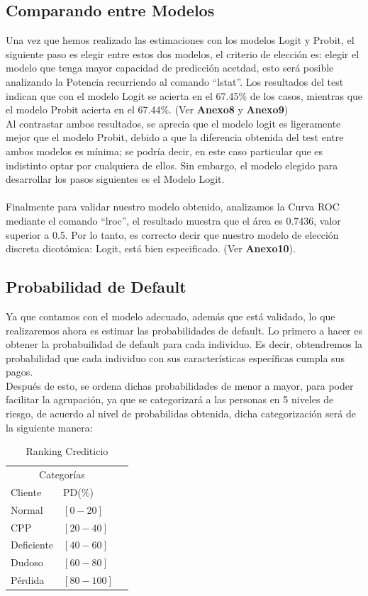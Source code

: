 \documentclass[11pt,fleqn]{book} %
\numberwithin{equation}{section} %
\numberwithin{figure}{section} %
\numberwithin{table}{section} %
\begin{document}
\subsection{Comparando entre Modelos}
Una vez que hemos realizado las estimaciones con los modelos Logit y Probit, el siguiente paso es elegir entre estos dos modelos, el criterio de elección es: elegir el modelo que tenga mayor capacidad de predicción acetdad, esto será posible analizando la Potencia recurriendo al comando ``lstat''. Los resultados del test indican que con el modelo Logit se acierta en el 67.45\% de los casos, mientras que el modelo Probit acierta en el 67.44\%. (Ver \textbf{Anexo8} y \textbf{Anexo9})  
\\
Al contrastar ambos resultados, se aprecia que el modelo logit es ligeramente mejor que el modelo Probit, debido a que la diferencia obtenida del test entre ambos modelos es mínima; se podría decir, en este caso particular que es indistinto optar por cualquiera de ellos. Sin embargo, el modelo elegido para desarrollar los pasos siguientes es el Modelo Logit.
\\\\
Finalmente para validar nuestro modelo obtenido, analizamos la Curva ROC mediante el comando ``lroc'', el resultado muestra que el área es 0.7436, valor superior a 0.5. Por lo tanto, es correcto decir que nuestro modelo de elección discreta dicotómica: Logit, está bien especificado. (Ver \textbf{Anexo10}).

\subsection{Probabilidad de Default}

Ya que contamos con el modelo adecuado, además que está validado, lo que realizaremos ahora es estimar las probabilidades de default. Lo primero a hacer es obtener la probabuilidad de default para cada individuo. Es decir, obtendremos la probabilidad que cada individuo con sus características específicas cumpla sus pagos.
\\
Después de esto, se ordena dichas probabilidades de menor a mayor, para poder facilitar la agrupación, ya que se categorizará a las personas en 5 niveles de riesgo, de acuerdo al nivel de probabilidas obtenida, dicha categorización será de la siguiente manera:

\begin{table}[H]
\caption{Ranking Crediticio}
\centering
\begin{tabular}{llr}
\toprule
\multicolumn{2}{c}{Categorías} \\
\cmidrule(r){1-2}
Cliente & PD(\%) \\
\midrule
Normal & $[0 - 20]$ \\
CPP & $[20 - 40]$ \\
Deficiente & $[40 - 60]$ \\
Dudoso & $[60- 80]$ \\
Pérdida & $[80 - 100]$ \\
\bottomrule
\end{tabular}
\end{table}
\end{document}
